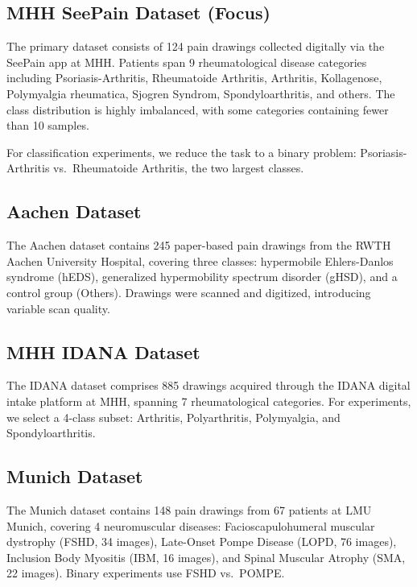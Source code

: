 \documentclass[conference]{IEEEtran}
\begin{document}
\subsection{MHH SeePain Dataset (Focus)}

The primary dataset consists of 124 pain drawings collected digitally via the SeePain app at MHH. Patients span 9 rheumatological disease categories including Psoriasis-Arthritis, Rheumatoide Arthritis, Arthritis, Kollagenose, Polymyalgia rheumatica, Sjogren Syndrom, Spondyloarthritis, and others. The class distribution is highly imbalanced, with some categories containing fewer than 10 samples.

For classification experiments, we reduce the task to a binary problem: Psoriasis-Arthritis vs.\ Rheumatoide Arthritis, the two largest classes.

\subsection{Aachen Dataset}

The Aachen dataset contains 245 paper-based pain drawings from the RWTH Aachen University Hospital, covering three classes: hypermobile Ehlers-Danlos syndrome (hEDS), generalized hypermobility spectrum disorder (gHSD), and a control group (Others). Drawings were scanned and digitized, introducing variable scan quality.

\subsection{MHH IDANA Dataset}

The IDANA dataset comprises 885 drawings acquired through the IDANA digital intake platform at MHH, spanning 7 rheumatological categories. For experiments, we select a 4-class subset: Arthritis, Polyarthritis, Polymyalgia, and Spondyloarthritis.

\subsection{Munich Dataset}

The Munich dataset contains 148 pain drawings from 67 patients at LMU Munich, covering 4 neuromuscular diseases: Facioscapulohumeral muscular dystrophy (FSHD, 34 images), Late-Onset Pompe Disease (LOPD, 76 images), Inclusion Body Myositis (IBM, 16 images), and Spinal Muscular Atrophy (SMA, 22 images). Binary experiments use FSHD vs.\ POMPE.

\end{document}
